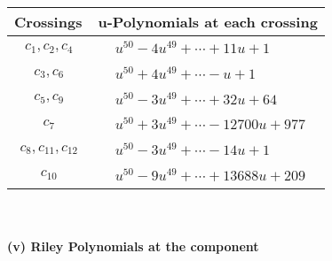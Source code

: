 \documentclass[1p]{elsarticle_modified}
\theoremstyle{definition}
\begin{document}
\begin{tabular}{m{50pt}|m{274pt}}
Crossings & \hspace{64pt}u-Polynomials at each crossing \\
\hline $$\begin{aligned}c_{1},c_{2},c_{4}\end{aligned}$$&$\begin{aligned}
&u^{50}-4 u^{49}+\cdots+11 u+1
\end{aligned}$\\
\hline $$\begin{aligned}c_{3},c_{6}\end{aligned}$$&$\begin{aligned}
&u^{50}+4 u^{49}+\cdots- u+1
\end{aligned}$\\
\hline $$\begin{aligned}c_{5},c_{9}\end{aligned}$$&$\begin{aligned}
&u^{50}-3 u^{49}+\cdots+32 u+64
\end{aligned}$\\
\hline $$\begin{aligned}c_{7}\end{aligned}$$&$\begin{aligned}
&u^{50}+3 u^{49}+\cdots-12700 u+977
\end{aligned}$\\
\hline $$\begin{aligned}c_{8},c_{11},c_{12}\end{aligned}$$&$\begin{aligned}
&u^{50}-3 u^{49}+\cdots-14 u+1
\end{aligned}$\\
\hline $$\begin{aligned}c_{10}\end{aligned}$$&$\begin{aligned}
&u^{50}-9 u^{49}+\cdots+13688 u+209
\end{aligned}$\\
\hline
\end{tabular}\\~\\
\newpage\renewcommand{\arraystretch}{1}
\flushleft \textbf{(v) Riley Polynomials at the component}\newline \\
\end{document}
